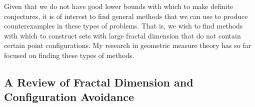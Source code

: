 \documentclass[11pt]{article}
\DeclareMathOperator{\RR}{\mathbb{R}}
\begin{document}
Given that we do not have good lower bounds with which to make definite conjectures, it is of interest to find general methods that we can use to produce counterexamples in these types of problems. That is, we wish to find methods with which to construct sets with large fractal dimension that do not contain certain point configurations. My research in geometric measure theory has so far focused on finding these types of methods.

\subsection{A Review of Fractal Dimension and Configuration Avoidance}


\end{document}
